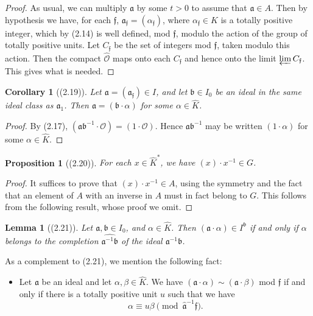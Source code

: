 \documentclass[12pt,a4paper]{article}
\theoremstyle{plain}
\newtheorem{lemma}[theorem]{Lemma}
\newtheorem{proposition}[theorem]{Proposition}
\newtheorem{corollary}[theorem]{Corollary}
\theoremstyle{definition}
\newcommand{\OO}{\mathcal{O}}
\newcommand{\ff}{\mathfrak{f}}
\begin{document}
\begin{proof}
As usual, we can multiply $\mathfrak{a}$ by some $t>0$ to assume that $\mathfrak{a}\in A$. Then by hypothesis we have, for each $\ff$, $\mathfrak{a}_{\ff}=(\alpha_{\ff})$, where $\alpha_{\ff}\in K$ is a totally positive integer, which by (2.14) is well defined, mod $\ff$, modulo the action of the group of totally positive units. Let $C_{\ff}$ be the set of integers mod $\ff$, taken modulo this action. Then the compact $\hat{\OO}$ maps onto each $C_{\ff}$ and hence onto the limit $\varprojlim C_{\ff}$. This gives what is needed.
\end{proof}

\begin{corollary}[(2.19)]\label{cor:representative}
Let $\mathfrak{a}=(\mathfrak{a}_{\ff})\in I$, and let $\mathfrak{b}\in I_0$ be an ideal in the same ideal class as $\mathfrak{a}_1$. Then $\mathfrak{a}=(\mathfrak{b}\cdot\alpha)$ for some $\alpha\in\hat{K}$.
\end{corollary}

\begin{proof}
By (2.17), $(\mathfrak{a}\mathfrak{b}^{-1}\cdot\mathcal{O})=(1\cdot\mathcal{O})$. Hence $\mathfrak{a}\mathfrak{b}^{-1}$ may be written $(1\cdot\alpha)$ for some $\alpha\in\hat{K}$.
\end{proof}

\begin{proposition}[(2.20)]\label{prop:j}
For each $x\in\hat{K}^*$, we have $(x)\cdot x^{-1}\in G$.
\end{proposition}

\begin{proof}
It suffices to prove that $(x)\cdot x^{-1}\in A$, using the symmetry and the fact that an element of $A$ with an inverse in $A$ must in fact belong to $G$. This follows from the following result, whose proof we omit.
\end{proof}

\begin{lemma}[(2.21)]\label{lem:closure}
Let $\mathfrak{a},\mathfrak{b}\in I_0$, and $\alpha\in\hat{K}$. Then $(\mathfrak{a}\cdot\alpha)\in I^{\mathfrak{b}}$ if and only if $\alpha$ belongs to the completion $\hat{\mathfrak{a}^{-1}\mathfrak{b}}$ of the ideal $\mathfrak{a}^{-1}\mathfrak{b}$.
\end{lemma}

As a complement to (2.21), we mention the following fact:

\begin{itemize}[leftmargin=2em]
\item[(2.22)] Let $\mathfrak{a}$ be an ideal and let $\alpha,\beta\in\hat{K}$. We have $(\mathfrak{a}\cdot\alpha)\sim(\mathfrak{a}\cdot\beta)$ mod $\ff$ if and only if there is a totally positive unit $u$ such that we have
\[
\alpha\equiv u\beta\pmod{\hat{\mathfrak{a}}^{-1}\ff}.
\]
\end{itemize}
\end{document}
